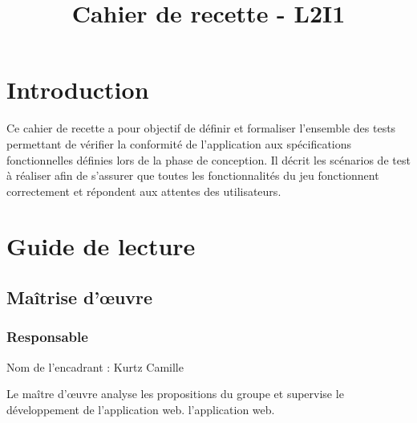 \documentclass{cahier_de_recette}
\title{Cahier de recette - L2I1} %
\begin{document}




        
\fairemarges %
\fairepagedegarde %
\renewcommand{\contentsname}{Sommaire}
\tableofcontents %
\newpage




\section{Introduction} 

Ce cahier de recette a pour objectif de définir et formaliser l’ensemble des tests permettant de
vérifier la conformité de l’application aux spécifications fonctionnelles définies lors de la phase de
conception. Il décrit les scénarios de test à réaliser afin de s’assurer que toutes les fonctionnalités du
jeu fonctionnent correctement et répondent aux attentes des utilisateurs.


\section{Guide de lecture}

\subsection{Maîtrise d’œuvre}
\subsubsection{Responsable}
Nom de l'encadrant : Kurtz Camille 

Le maître d’œuvre analyse les propositions du groupe et supervise le développement de l'application web.
l'application web.
\end{document}

